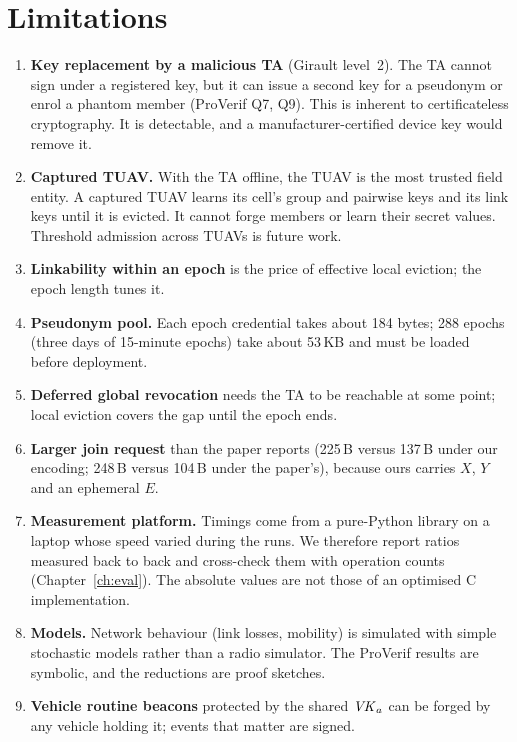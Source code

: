 \section{Limitations}
\begin{enumerate}[label=\textbf{L\arabic*.},leftmargin=*]
  \item \textbf{Key replacement by a malicious TA} (Girault level~2). The TA cannot sign under a registered key, but it can issue a second key for a pseudonym or enrol a
        phantom member (ProVerif Q7, Q9). This is inherent to certificateless cryptography. It is detectable, and a manufacturer-certified device key would
        remove it.
  \item \textbf{Captured TUAV.} With the TA offline, the TUAV is the most trusted field entity. A captured TUAV learns its cell's group and pairwise keys and
        its link keys until it is evicted. It cannot forge members or learn their secret values. Threshold admission across TUAVs is future work.
  \item \textbf{Linkability within an epoch} is the price of effective local eviction; the epoch length tunes it.
  \item \textbf{Pseudonym pool.} Each epoch credential takes about 184 bytes; 288 epochs (three days of 15-minute epochs) take about 53\,KB and must be loaded before deployment.
  \item \textbf{Deferred global revocation} needs the TA to be reachable at some point; local eviction covers the gap until the epoch ends.
  \item \textbf{Larger join request} than the paper reports (225\,B versus 137\,B under our encoding; 248\,B versus 104\,B under the paper's), because ours
        carries $X$, $Y$ and an ephemeral $E$.
  \item \textbf{Measurement platform.} Timings come from a pure-Python library on a laptop whose speed varied during the runs. We therefore report ratios measured
        back to back and cross-check them with operation counts (Chapter~\ref{ch:eval}). The absolute values are not those of an optimised C implementation.
  \item \textbf{Models.} Network behaviour (link losses, mobility) is simulated with simple stochastic models rather than a radio simulator. The ProVerif
        results are symbolic, and the reductions are proof sketches.
  \item \textbf{Vehicle routine beacons} protected by the shared $\mathit{VK}_a$ can be forged by any vehicle holding it; events that matter are signed.
\end{enumerate}

